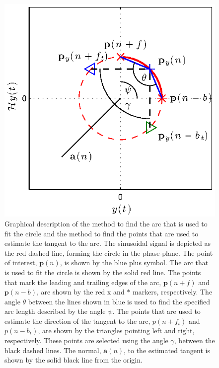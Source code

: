 \documentclass[a4paper]{IEEEtran}
\begin{document}
\begin{figure}[ht]
	\centering
		\includegraphics[scale=1]{./Figures/eps/SetArcLengthDemo.eps}
	\caption{Graphical description of the method to find the arc that is used to fit the circle and the method to find the points that are used to estimate the tangent to the arc. The sinusoidal signal is depicted as the red dashed line, forming the circle in the phase-plane. The point of interest, $\mathbf{p}(n)$, is shown by the blue plus symbol. The arc that is used to fit the circle is shown by the solid red line. The points that mark the leading and trailing edges of the arc, $\mathbf{p}(n+f)$ and $\mathbf{p}(n-b)$, are shown by the red x and $\ast$ markers, respectively. The angle $\theta$ between the lines shown in blue is used to find the specified arc length described by the angle $\psi$. The points that are used to estimate the direction of the tangent to the arc, $p(n+f_t)$ and $p(n-b_t)$, are shown by the triangles pointing left and right, respectively. These points are selected using the angle $\gamma$, between the black dashed lines. The normal, $\mathbf{a}(n)$, to the estimated tangent is shown by the solid black line from the origin.}
	\label{fig:SetArcLengthDemo}
\end{figure}
\end{document}

